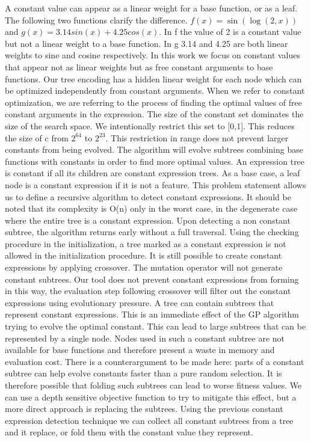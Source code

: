 A constant value can appear as a linear weight for a base function, or as a leaf. The following two functions clarify the difference. $ f(x) = \sin(\log(2, x))$ and $ g(x) = 3.14 sin(x) + 4.25 cos(x)$. In f the value of 2 is a constant value but not a linear weight to a base function. In g 3.14 and 4.25 are both linear weights to sine and cosine respectively. In this work we focus on constant values that appear not as linear weights but as free constant arguments to base functions. Our tree encoding has a hidden linear weight for each node which can be optimized independently from constant arguments. When we refer to constant optimization, we are referring to the process of finding the optimal values of free constant arguments in the expression.
The size of the constant set dominates the size of the search space. We intentionally restrict this set to [0,1]. This reduces the size of c from $2^{64}$ to $2^{23}$. This restriction in range does not prevent larger constants from being evolved. The algorithm will evolve subtrees combining base functions with constants in order to find more optimal values.
An expression tree is constant if all its children are constant expression trees. As a base case, a leaf node is a constant expression if it is not a feature. This problem statement allows us to define a recursive algorithm to detect constant expressions. It should be noted that its complexity is O(n) only in the worst case, in the degenerate case where the entire tree is a constant expression. Upon detecting a non constant subtree, the algorithm returns early without a full traversal. 
Using the checking procedure in the initialization, a tree marked as a constant expression is not allowed in the initialization procedure. It is still possible to create constant expressions by applying crossover. The mutation operator will not generate constant subtrees. Our tool does not prevent constant expressions from forming in this way, the evaluation step following crossover will filter out the constant expressions using evolutionary pressure. A tree can contain subtrees that represent constant expressions. This is an immediate effect of the GP algorithm trying to evolve the optimal constant. This can lead to large subtrees that can be represented by a single node. Nodes used in such a constant subtree are not available for base functions and therefore present a waste in memory and evaluation cost. There is a counterargument to be made here: parts of a constant subtree can help evolve constants faster than a pure random selection. It is therefore possible that folding such subtrees can lead to worse fitness values. We can use a depth sensitive objective function to try to mitigate this effect, but a more direct approach is replacing the subtrees. Using the previous constant expression detection technique we can collect all constant subtrees from a tree and it replace, or fold them with the constant value they represent.
